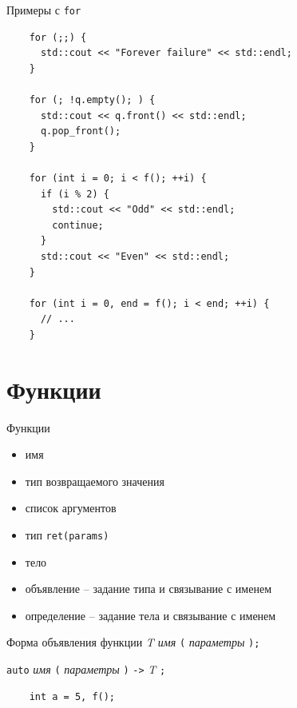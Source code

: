 \documentclass[unknownkeysallowed,xcolor=table]{beamer}
\begin{document}
\begin{frame}[fragile]{Примеры с \lstinline{for}}
  \begin{lstlisting}
    for (;;) {
      std::cout << "Forever failure" << std::endl;
    }

    for (; !q.empty(); ) {
      std::cout << q.front() << std::endl;
      q.pop_front();
    }

    for (int i = 0; i < f(); ++i) {
      if (i % 2) {
        std::cout << "Odd" << std::endl;
        continue;
      }
      std::cout << "Even" << std::endl;
    }

    for (int i = 0, end = f(); i < end; ++i) {
      // ...
    }
  \end{lstlisting}
\end{frame}

\section{Функции}

\begin{frame}{Функции}
  \begin{itemize}
    \item имя \vspace{0.5em}
    \item тип возвращаемого значения \vspace{0.5em}
    \item список аргументов \vspace{0.5em}
    \item тип \lstinline{ret(params)} \vspace{0.5em}
    \item тело
  \end{itemize}

  \vspace{1em}

  \begin{itemize}
    \item объявление -- задание типа и связывание с именем \vspace{0.5em}
    \item определение -- задание тела и связывание с именем
  \end{itemize}
\end{frame}

\begin{frame}[fragile]{Форма объявления функции}
  \emph{T имя} \lstinline{(} \emph{параметры} \lstinline{);}

  \vspace{1em}

  \lstinline{auto} \emph{имя} \lstinline{(} \emph{параметры} \lstinline{)} \lstinline{->} \emph{T} \lstinline{;}

  \vspace{2em}

  \begin{lstlisting}
    int a = 5, f();
  \end{lstlisting}
\end{frame}
\end{document}
